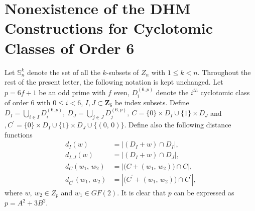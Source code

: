 \documentclass[letter]{ieice}
\begin{document}
\section{Nonexistence of the DHM Constructions for Cyclotomic Classes of Order 6}\label{sec 3}
Let $ \mathbb{S}_{n}^{k} $ denote the set of all the $ k $-subsets of $ Z_{n} $ with $ 1\leq k< n $. 
Throughout the rest of the present letter, the following notation is kept unchanged. Let $ p=6f+1 $ be  an odd prime with $ f $ even, $ D_{i}^{(6,p)} $ denote the $ i^{th} $ cyclotomic class of order 6 with $ 0\leq i<6 $, $ I,J\subset \mathbf{Z}_{6} $ be index subsets. Define $ \mathit{D}_{I}=\bigcup_{i\in I}D_{i}^{(6,p)},\  \mathit{D}_{J}=\bigcup_{j\in J}D_{j}^{(6,p)},\ \mathit{C}=\lbrace 0\rbrace\times  \mathit{D}_{I}\cup \lbrace 1\rbrace\times  \mathit{D}_{J}$ and $ ,\mathit{C}^{'}=\lbrace 0\rbrace\times  \mathit{D}_{I}\cup \lbrace 1\rbrace\times  \mathit{D}_{J}\cup \lbrace(0,\,0) \rbrace$. Define also the following distance functions
 \begin{equation*}
 \begin{split}
 d_{I}(w)&=|( \mathit{D}_{I}+w)\cap  \mathit{D}_{I}|,\\
 d_{I,J}(w)&=|( \mathit{D}_{I}+w)\cap  \mathit{D}_{J}|,\\
 d_{\mathit{C}}(w_{1},\,w_{2})&=|\bigl(\mathit{C}+(w_{1},\,w_{2}) \bigr)\cap \mathit{C}|,\\
 d_{\mathit{C}^{'}}(w_{1},\,w_{2})&=|\bigl(\mathit{C}^{'}+(w_{1},\,w_{2}) \bigr)\cap \mathit{C}^{'}|,
 \end{split}
 \end{equation*}
 where $ w,\ w_{2} \in Z_{p}$ and $ w_{1} \in \mathit{GF}(2) $. It is clear that  $ p $ can be expressed as $ p=A^{2}+3B^{2}$\cite{ar01,ar02}. 
\end{document}
